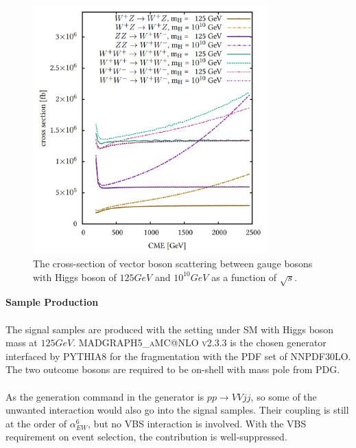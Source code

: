 \begin{figure}[tbp]
	\begin{center}
		\includegraphics[width=0.8\textwidth,keepaspectratio]{Chapter5/VBSXS_heavyhiggs.png}
		\caption{The cross-section of vector boson scattering between gauge bosons with Higgs boson of $125GeV$ and $10^{10}GeV$ as a function of $\sqrt{s}$.}
		\label{Fig:VBSXS_heavyhiggs}
	\end{center}
\end{figure} 
\noindent
{\bf Sample Production}
\\
\\The signal samples are produced with the setting under SM with Higgs boson mass at $125GeV$. \textsc{MADGRAPH5\_aMC@NLO v2.3.3} is the chosen generator interfaced by \textsc{PYTHIA8} for the fragmentation with the PDF set of NNPDF30LO. The two outcome bosons are required to be on-shell with mass pole from PDG. 
\\
\\As the generation command in the generator is $pp \to VVjj$, so some of the unwanted interaction would also go into the signal samples. Their coupling is still at the order of $\alpha_{EW}^6$, but no VBS interaction is involved. With the VBS requirement on event selection, the contribution is well-suppressed. 
\noindent
